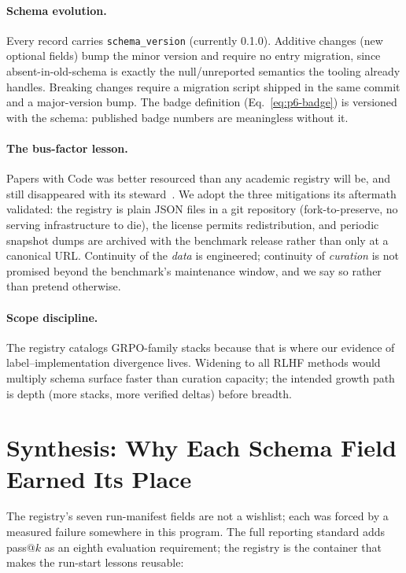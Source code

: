 \documentclass{article}
\begin{document}
\paragraph{Schema evolution.}
Every record carries \texttt{schema_version} (currently 0.1.0). Additive
changes (new optional fields) bump the minor version and require no entry
migration, since absent-in-old-schema is exactly the null/unreported semantics
the tooling already handles. Breaking changes require a migration script
shipped in the same commit and a major-version bump. The badge definition
(Eq.~\ref{eq:p6-badge}) is versioned with the schema: published badge numbers
are meaningless without it.

\paragraph{The bus-factor lesson.}
Papers with Code was better resourced than any academic registry will be, and
still disappeared with its steward~\citep{paperswithcode2025}. We adopt the
three mitigations its aftermath validated: the registry is plain JSON files in
a git repository (fork-to-preserve, no serving infrastructure to die), the
license permits redistribution, and periodic snapshot dumps are archived with
the benchmark release rather than only at a canonical URL. Continuity of the
\emph{data} is engineered; continuity of \emph{curation} is not promised
beyond the benchmark's maintenance window, and we say so rather than pretend
otherwise.

\paragraph{Scope discipline.}
The registry catalogs GRPO-family stacks because that is where our evidence
of label--implementation divergence lives. Widening to all RLHF methods would
multiply schema surface faster than curation capacity; the intended growth
path is depth (more stacks, more verified deltas) before breadth.
 \section{Synthesis: Why Each Schema Field Earned Its Place}
\label{sec:p6-synthesis}

The registry's seven run-manifest fields are not a wishlist; each was forced by
a measured failure somewhere in this program. The full reporting standard adds
pass@$k$ as an eighth evaluation requirement; the registry is the container that
makes the run-start lessons reusable:
\end{document}
